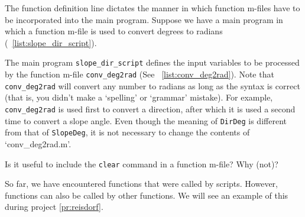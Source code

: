 The function definition line dictates the manner in which function m-files have to be incorporated into the main program. Suppose we have a main program in which a function m-file is used to convert degrees to radians (\lstlistingname{}~\ref{list:slope_dir_script}).


\label{lab:conv_deg2rad}


\noindent The main program {\tt slope\_dir\_script} defines the input variables to be processed by the function m-file {\tt conv\_deg2rad} (See \lstlistingname{}~\ref{list:conv_deg2rad}). Note that {\tt conv\_deg2rad} will convert any number to radians as long as the syntax is correct (that is, you didn't make a `spelling' or `grammar' mistake). For example, {\tt conv\_deg2rad} is used first to convert a direction, after which it is used a second time to convert a slope angle. Even though the meaning of {\tt DirDeg} is different from that of {\tt SlopeDeg}, it is not necessary to change the contents of `conv\_deg2rad.m'.


\begin{action}
Is it useful to include the {\tt clear} command in a function m-file? Why (not)?
\end{action}

\noindent So far, we have encountered functions that were called by scripts. However, functions can also be called by other functions. We will see an example of this during project \ref{pr:reisdorf}.